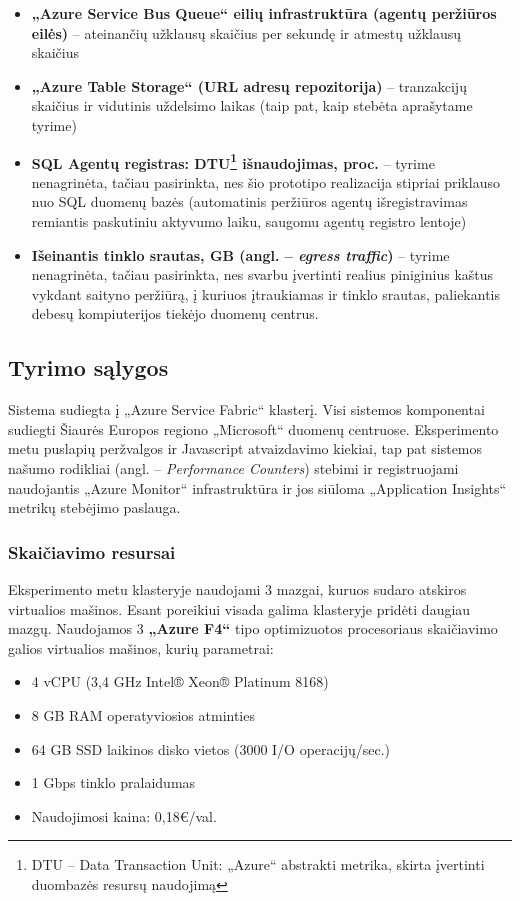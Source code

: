 \begin{itemize}
    \item \textbf{„Azure Service Bus Queue“ eilių infrastruktūra (agentų peržiūros eilės)} -- ateinančių užklausų skaičius per sekundę ir atmestų užklausų skaičius
    \item \textbf{„Azure Table Storage“ (URL adresų repozitorija) }-- tranzakcijų skaičius ir vidutinis uždelsimo laikas (taip pat, kaip stebėta \cite{MercedCloudBasedWebCrawler} aprašytame tyrime)
    \item \textbf{ SQL Agentų registras: DTU\footnote{DTU -- Data Transaction Unit: „Azure“ abstrakti metrika, skirta įvertinti duombazės resursų naudojimą} išnaudojimas, proc. } -- \cite{MercedCloudBasedWebCrawler} tyrime nenagrinėta, tačiau pasirinkta, nes šio prototipo realizacija stipriai priklauso nuo SQL duomenų bazės (automatinis peržiūros agentų išregistravimas remiantis paskutiniu aktyvumo laiku, saugomu agentų registro lentoje)
    \item \textbf{ Išeinantis tinklo srautas, GB (angl. -- \textit{egress traffic})} -- \cite{MercedCloudBasedWebCrawler} tyrime nenagrinėta, tačiau pasirinkta, nes svarbu įvertinti realius piniginius kaštus vykdant saityno peržiūrą, į kuriuos įtraukiamas ir tinklo srautas, paliekantis debesų kompiuterijos tiekėjo duomenų centrus.
\end{itemize}

\subsection{Tyrimo sąlygos}

Sistema sudiegta į „Azure Service Fabric“ klasterį. Visi sistemos komponentai sudiegti Šiaurės Europos regiono „Microsoft“ duomenų centruose. Eksperimento metu puslapių peržvalgos ir Javascript atvaizdavimo kiekiai, tap pat sistemos našumo rodikliai (angl. -- \textit{Performance Counters}) stebimi ir registruojami naudojantis „Azure Monitor“ infrastruktūra ir jos siūloma „Application Insights“ metrikų stebėjimo paslauga.

\subsubsection{Skaičiavimo resursai}

Eksperimento metu klasteryje naudojami 3 mazgai, kuruos sudaro atskiros virtualios mašinos. Esant poreikiui visada galima klasteryje pridėti daugiau mazgų. Naudojamos 3 \textbf{„Azure F4“} tipo optimizuotos procesoriaus skaičiavimo galios virtualios mašinos, kurių parametrai:
\begin{itemize}
    \item 4 vCPU (3,4 GHz Intel® Xeon® Platinum 8168)
    \item 8 GB RAM operatyviosios atminties
    \item 64 GB SSD laikinos disko vietos (3000 I/O operacijų/sec.)
    \item 1 Gbps tinklo pralaidumas
    \item Naudojimosi kaina: 0,18€/val.
\end{itemize}

